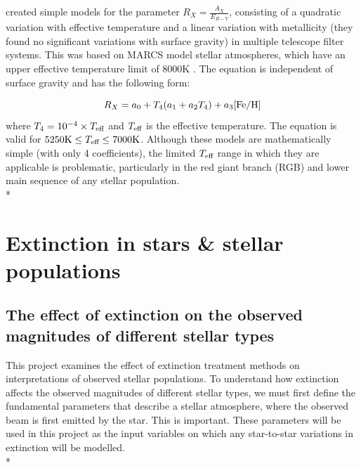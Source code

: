 \documentclass[12pt, a4paper]{report}
\begin{document}
\cite{2014MNRAS.444..392C,2018MNRAS.475.5023C,2018MNRAS.479L.102C} created simple  models for the parameter $R_{X}  = \frac{A_{X}}{E_{B-V}}$, consisting of a quadratic variation with effective temperature and a linear variation with metallicity (they found no significant variations with surface gravity) in multiple telescope filter systems. This was based on MARCS model stellar atmospheres, which have an upper effective temperature limit of 8000K \citep{2008A&A...486..951G}. The equation is independent of surface gravity and has the following form:

\begin{equation}
R_{X} = a_{0} + T_{4}(a_{1} + a_{2}T_{4}) + a_{3}\textnormal{[Fe/H]}
\label{casagrande_ext_fit}
\end{equation}
where $T_{4} = 10^{-4} \times T_{\textnormal{eff}}$ and $T_{\textnormal{eff}}$ is the effective temperature. The equation is valid for $5250\textnormal{K} \leq T_{\textnormal{eff}} \leq 7000\textnormal{K}$. Although these models are mathematically simple (with only 4 coefficients), the limited $T_{\textnormal{eff}}$ range in which they are applicable is problematic, particularly in the red giant branch (RGB) and lower main sequence of any stellar population.\\*

\section{Extinction in stars \& stellar populations}

\subsection{The effect of extinction on the observed magnitudes of different stellar types} \label{params}

This project examines the effect of extinction treatment methods on interpretations of observed stellar populations. To understand how extinction affects the observed magnitudes of different stellar types, we must first define the fundamental parameters that describe a stellar atmosphere, where the observed beam is first emitted by the star. This is important. These parameters will be used in this project as the input variables on which any star-to-star variations in extinction will be modelled. \\*
\end{document}
